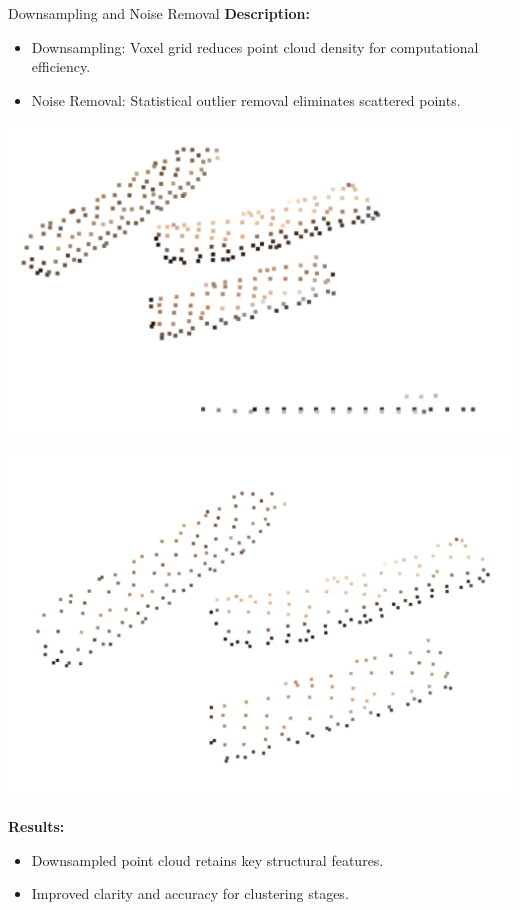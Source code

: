 \documentclass[10pt]{beamer}
\begin{document}
\begin{frame}{Downsampling and Noise Removal}
	\textbf{Description:}
	\begin{itemize}
		\item Downsampling: Voxel grid reduces point cloud density for computational efficiency.
		\item Noise Removal: Statistical outlier removal eliminates scattered points.
	\end{itemize}
	
	
	\begin{minipage}{0.42\textwidth} %
		\centering
		\includegraphics[width=\textwidth]{img/voxelGrid.png} %
		
	\end{minipage}
	\hfill %
	\begin{minipage}{0.42\textwidth} %
		\centering
		\includegraphics[width=\textwidth]{img/outlier.png} %
	\end{minipage}
	
	\textbf{Results:}
	\begin{itemize}
		\item Downsampled point cloud retains key structural features.
		\item Improved clarity and accuracy for clustering stages.
	\end{itemize}
\end{frame}
\end{document}
